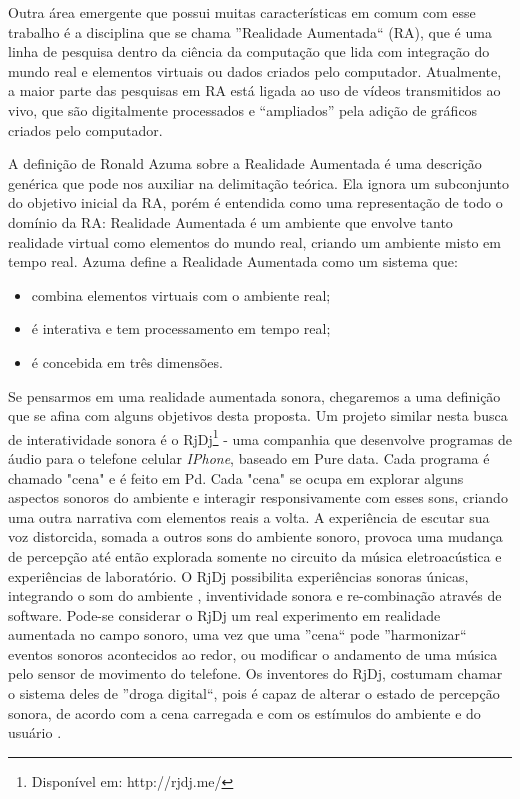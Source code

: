 \documentclass{ppgmus}
\begin{document}
Outra área emergente que possui muitas características em comum com esse 
trabalho é a disciplina que se chama ''Realidade Aumentada`` (RA), que é uma linha de pesquisa dentro da ciência da computação que lida com 
integração do mundo real e elementos virtuais ou dados criados pelo computador. Atualmente, a 
maior parte das pesquisas em RA está ligada ao uso de vídeos transmitidos ao vivo, que são 
digitalmente processados e “ampliados” pela adição de gráficos criados pelo computador.

A definição de Ronald Azuma 
sobre a Realidade Aumentada \cite{azuma97:ar} é uma descrição genérica que pode nos auxiliar na delimitação teórica. 
Ela ignora um subconjunto do objetivo inicial da RA, porém é entendida como uma representação 
de todo o domínio da RA: Realidade Aumentada é um ambiente que envolve tanto realidade virtual 
como elementos do mundo real, criando um ambiente misto em tempo real.
Azuma define a Realidade Aumentada como um sistema que:
\begin{itemize}
 \item combina elementos virtuais com o ambiente real; 
  \item é interativa e tem processamento em tempo real; 
  \item  é concebida em três dimensões.
\end{itemize}

    
Se pensarmos em uma realidade aumentada sonora, chegaremos a uma definição que se afina 
com alguns objetivos desta proposta.
Um projeto similar nesta busca de interatividade sonora é o RjDj\footnote{Disponível em: http://rjdj.me/}
 - uma companhia que desenvolve 
programas de áudio para o telefone celular \textit{IPhone}, baseado em Pure data. Cada programa 
é chamado "cena" e é feito em Pd. Cada "cena" se ocupa em explorar alguns 
aspectos sonoros do ambiente e interagir responsivamente com esses sons, criando uma 
outra narrativa com elementos reais a volta. A experiência de escutar sua voz distorcida,
somada a outros sons do ambiente sonoro, provoca uma mudança de percepção até então 
explorada somente no circuito da música eletroacústica e experiências de laboratório. 
O RjDj possibilita experiências sonoras únicas, integrando o som do ambiente , 
inventividade sonora e re-combinação através de software. Pode-se considerar o 
RjDj um real experimento em realidade aumentada no campo sonoro, uma vez que uma ''cena``
pode ''harmonizar`` eventos sonoros acontecidos ao redor, ou modificar o andamento de
uma música pelo sensor de movimento do telefone. Os inventores do RjDj, costumam chamar 
o sistema deles de ''droga digital``, pois é capaz de alterar o estado de percepção sonora,
de acordo com a cena carregada e com os estímulos do ambiente e do usuário \cite{rj}. 
\end{document}
